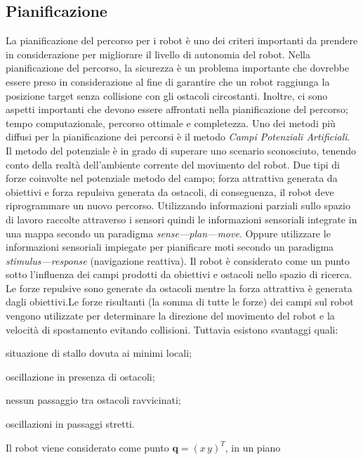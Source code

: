 \subsection{Pianificazione}
La pianificazione del percorso per i robot è uno dei criteri importanti da
prendere in considerazione per migliorare il livello di autonomia del robot.
Nella pianificazione del percorso, la sicurezza è un problema importante che 
dovrebbe essere preso in considerazione al fine di garantire che un robot 
raggiunga la posizione target senza collisione con gli ostacoli circostanti.
Inoltre, ci sono aspetti importanti che devono essere affrontati nella 
pianificazione del percorso; tempo computazionale, percorso ottimale e 
completezza. 
Uno dei metodi più diffusi per la pianificazione dei percorsi è il metodo 
\emph{Campi Potenziali Artificiali}. 
Il metodo del potenziale è in grado di superare uno scenario sconosciuto, 
tenendo conto della realtà dell'ambiente corrente del movimento del robot. 
Due tipi di forze coinvolte nel potenziale metodo del campo; forza attrattiva 
generata da obiettivi e forza repulsiva generata da ostacoli, di conseguenza, 
il robot deve riprogrammare un nuovo percorso\cite{apotetianfield}.
Utilizzando informazioni parziali sullo spazio di lavoro raccolte attraverso i 
sensori quindi le informazioni sensoriali integrate in una mappa secondo un 
paradigma \emph{sense---plan---move}.
Oppure utilizzare le informazioni sensoriali impiegate per pianificare moti 
secondo un paradigma \emph{stimulus---response} (navigazione reattiva).
Il robot è considerato come un punto sotto l'influenza dei campi prodotti da 
obiettivi e ostacoli nello spazio di ricerca. Le forze repulsive sono generate 
da ostacoli mentre la forza attrattiva è generata dagli obiettivi.Le forze 
risultanti (la somma di tutte le forze) dei campi sul robot vengono utilizzate 
per determinare la direzione del movimento del robot e la velocità di 
spostamento evitando collisioni\cite{5498220}.
Tuttavia esistono svantaggi quali:
\begin{enumerate*}[label={\alph*)},font={\bfseries}]
\item situazione di stallo dovuta ai minimi locali; 
\item oscillazione in presenza di ostacoli; 
\item nessun passaggio tra ostacoli ravvicinati; 
\item oscillazioni in passaggi stretti\cite{131810}.
\end{enumerate*}
Il robot viene considerato come punto $\mathbf{q} = (x \, y)^T$, in un piano 
